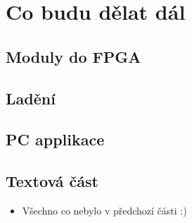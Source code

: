 \documentclass{beamer}
\begin{document}
\section{Co budu dělat dál}

\subsection{Moduly do FPGA}
\subsection{Ladění}
\subsection{PC applikace}
\subsection{Textová část}
\begin{frame}{}
	\begin{itemize}
		\item Všechno co nebylo v předchozí části :)
		\end{itemize}
	\end{frame}
\end{document}
